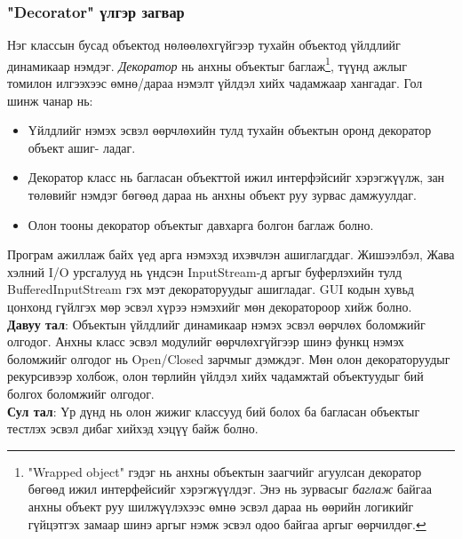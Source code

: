 \subsubsection{"Decorator" үлгэр загвар}
\quad \quad Нэг классын бусад объектод нөлөөлөхгүйгээр тухайн объектод үйлдлийг динамикаар нэмдэг. \textit{Декоратор} нь анхны объектыг баглаж\footnote{"Wrapped object" гэдэг нь анхны объектын заагчийг агуулсан декоратор бөгөөд ижил интерфейсийг хэрэгжүүлдэг. Энэ нь зурвасыг \textit{баглаж} байгаа анхны объект руу шилжүүлэхээс өмнө эсвэл дараа нь өөрийн логикийг гүйцэтгэх замаар шинэ аргыг нэмж эсвэл одоо байгаа аргыг өөрчилдөг.}, түүнд ажлыг томилон илгээхээс өмнө/дараа нэмэлт үйлдэл хийх чадамжаар хангадаг. Гол шинж чанар нь:
\begin{itemize}
	\item Үйлдлийг нэмэх эсвэл өөрчлөхийн тулд тухайн объектын оронд декоратор объект ашиг- ладаг. 
	\item Декоратор класс нь багласан объекттой ижил интерфэйсийг хэрэгжүүлж, зан төлөвийг нэмдэг бөгөөд дараа нь анхны объект руу зурвас дамжуулдаг.
	\item Олон тооны декоратор объектыг давхарга болгон баглаж болно.
\end{itemize}
Програм ажиллаж байх үед арга нэмэхэд ихэвчлэн ашиглагддаг. Жишээлбэл, Жава хэлний I/O урсгалууд нь үндсэн InputStream-д аргыг буферлэхийн тулд BufferedInputStream гэх мэт декораторуудыг ашигладаг. GUI кодын хувьд цонхонд гүйлгэх мөр эсвэл хүрээ нэмэхийг мөн декоратороор хийж болно.\\
\textbf{Давуу тал}: Объектын үйлдлийг динамикаар нэмэх эсвэл өөрчлөх боломжийг олгодог. Анхны класс эсвэл модулийг өөрчлөхгүйгээр шинэ функц нэмэх боломжийг олгодог нь Open/Closed зарчмыг дэмждэг. Мөн олон декораторуудыг рекурсивээр холбож, олон төрлийн үйлдэл хийх чадамжтай объектуудыг бий болгох боломжийг олгодог.\\
\textbf{Сул тал}: Үр дүнд нь олон жижиг классууд бий болох ба багласан объектыг тестлэх эсвэл дибаг хийхэд хэцүү байж болно.
